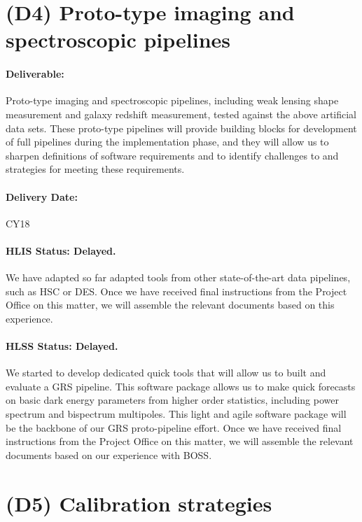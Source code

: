 \section*{(D4) Proto-type imaging and spectroscopic pipelines}

\paragraph*{Deliverable:} Proto-type imaging and spectroscopic pipelines,
including weak lensing shape measurement and galaxy redshift measurement, tested
against the above artificial data sets. These proto-type pipelines will provide
building blocks for development of full pipelines during the implementation
phase, and they will allow us to sharpen definitions of software requirements
and to identify challenges to and strategies for meeting these requirements.

\paragraph*{Delivery Date:} CY18

\paragraph*{HLIS Status: Delayed.} We have adapted so far adapted tools from other state-of-the-art data pipelines, such as HSC or DES. Once we have received final instructions from the Project Office on this matter, we will assemble the relevant documents based on this experience.

\paragraph*{HLSS Status: Delayed.} We started to develop dedicated quick tools that
will allow us to built and evaluate a GRS pipeline. This software package allows us to make quick forecasts on basic dark energy parameters from higher order statistics, including power spectrum and bispectrum multipoles. This light and agile software package will be the backbone of our GRS proto-pipeline effort. Once we have received final instructions from the Project Office on this matter, we will assemble the relevant documents based on our experience with BOSS.

\section*{(D5) Calibration strategies}

